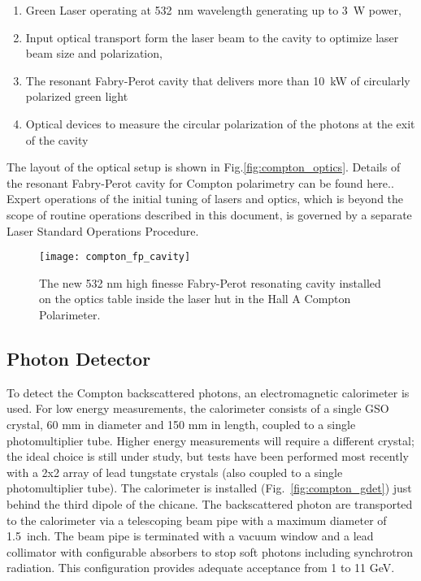 \begin{enumerate}
\item Green Laser operating at 532~nm wavelength generating up to 3~W power,
\item Input optical transport  form the laser beam to the cavity to optimize laser beam size and polarization,
\item The resonant Fabry-Perot cavity that delivers more than 10~kW of circularly polarized green light
\item Optical devices to measure the circular polarization of the photons at the exit of the cavity
\end{enumerate}


The layout of the optical setup is shown in Fig.\ref{fig:compton_optics}.
Details of the resonant Fabry-Perot cavity for
Compton polarimetry can be found here.\cite{compton_IR_cavity_pub}.
 Expert operations of the initial tuning of lasers and optics, which is beyond the scope of routine operations described in this document,  is governed by a separate Laser Standard Operations Procedure\cite{compton_LSOP}.

\begin{figure}[htp]
    \begin{center}
        \texttt{[image: compton\_fp\_cavity]}
    \end{center}
    \caption[compton:FP Cavity]{
            The new 532 nm high finesse Fabry-Perot resonating cavity installed on the optics table inside the laser hut in the Hall A Compton Polarimeter.
            }
    \label{fig:compton_cavity}
 \end{figure}

\subsection{Photon Detector}
To detect the Compton backscattered photons, an electromagnetic calorimeter is used. For low energy measurements, the calorimeter
consists of a single GSO crystal, 60 mm in diameter and 150 mm in length, coupled to a single photomultiplier tube. Higher energy
measurements will require a different crystal; the ideal choice is still under study, but tests have been performed most recently
with a 2x2 array of lead tungstate crystals (also coupled to a single photomultiplier tube). The calorimeter is installed
(Fig.~\ref{fig:compton_gdet})  just behind the third  dipole of the chicane. The backscattered photon are transported to the
calorimeter via a telescoping  beam pipe with a maximum diameter of  1.5~inch. The beam pipe is terminated with a vacuum window and
a lead collimator with configurable absorbers to stop soft photons including synchrotron radiation. This configuration
provides adequate acceptance from  1 to 11 GeV.  

